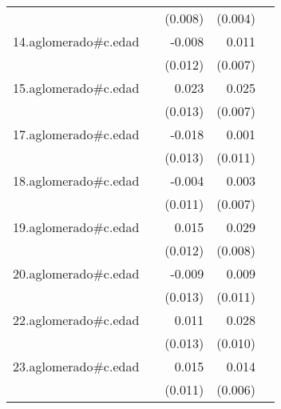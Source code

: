 {\begin{longtable}{l*{4}{D{.}{.}{-1}}}
            &                     &     (0.008)         &     (0.004)         &                     \\
\addlinespace
14.aglomerado#c.edad&                     &      -0.008         &       0.011         &                     \\
            &                     &     (0.012)         &     (0.007)         &                     \\
\addlinespace
15.aglomerado#c.edad&                     &       0.023         &       0.025\sym{***}&                     \\
            &                     &     (0.013)         &     (0.007)         &                     \\
\addlinespace
17.aglomerado#c.edad&                     &      -0.018         &       0.001         &                     \\
            &                     &     (0.013)         &     (0.011)         &                     \\
\addlinespace
18.aglomerado#c.edad&                     &      -0.004         &       0.003         &                     \\
            &                     &     (0.011)         &     (0.007)         &                     \\
\addlinespace
19.aglomerado#c.edad&                     &       0.015         &       0.029\sym{***}&                     \\
            &                     &     (0.012)         &     (0.008)         &                     \\
\addlinespace
20.aglomerado#c.edad&                     &      -0.009         &       0.009         &                     \\
            &                     &     (0.013)         &     (0.011)         &                     \\
\addlinespace
22.aglomerado#c.edad&                     &       0.011         &       0.028\sym{**} &                     \\
            &                     &     (0.013)         &     (0.010)         &                     \\
\addlinespace
23.aglomerado#c.edad&                     &       0.015         &       0.014\sym{*}  &                     \\
            &                     &     (0.011)         &     (0.006)         &                     \\

\end{longtable}}
